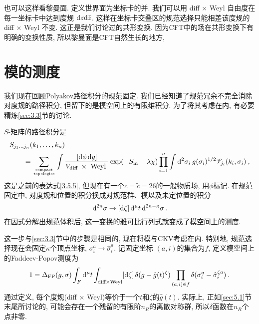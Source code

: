 也可以这样看黎曼面. 定义世界面为坐标卡的并. 我们可以用 diff $\times$ Weyl 自由度在每一坐标卡中达到度规 $\mathrm{d} z \mathrm{d} \bar{z}$. 
这样在坐标卡交叠区的规范选择只能相差该度规的diff $\times$ Weyl 不变. 这正是我们讨论过的共形变换. 
因为CFT中的场在共形变换下有明确的变换性质, 所以黎曼面是CFT自然生长的地方, 

\section{\texorpdfstring{模的测度}{5.3 The measure for moduli}} \label{sec:5.3}

我们现在回顾Polyakov路径积分的规范固定. 我们已经知道了规范冗余不完全消除对度规的路径积分, 但留下的是模空间上的有限维积分. 
为了将其考虑在内, 有必要精炼\ref{sec:3.3}节的讨论.

$S$-矩阵的路径积分是
	\begin{align}
		&S_{j_{1} \ldots j_{n}}(k_{1}, \ldots, k_{n})  \nonumber \\
		&\qquad=\sum_{\text{compact} \atop
				\text {topologies}} \int \frac{[\mathrm{d} \phi \,\mathrm{d} g]}{V_{\text {diff }} \times \text { Weyl }} 
				\exp (-S_{\mathrm{m}}-\lambda \chi) \prod_{i=1}^{n} \int \mathrm{d}^{2} \sigma_{i} \: g(\sigma_{i})^{1 / 2} 
				\mathscr{V}_{j_{i}}(k_{i}, \sigma_{i}) \:, \label{5.3.1}
	\end{align}
这是之前的表达式\eqref{3.5.5}, 但现在有一个$c=\tilde{c}=26$的一般物质场, 用$\phi$标记. 在规范固定中, 对度规和位置的积分换成对规范群、模以及未定位置的积分
\begin{equation}
	[\dif g]\, \dif^{2 n} \sigma \rightarrow [\dif \zeta] \,\dif^{\mu} t \,\dif^{2 n-\kappa} \sigma \:. \label{5.3.2}
\end{equation}
在因式分解出规范体积后, 这一变换的雅可比行列式就变成了模空间上的测度.

这一步与\ref{sec:3.3}节中的步骤是相同的, 现在将模与CKV考虑在内. 特别地, 规范选择现在会固定$\kappa$个顶点坐标, $\sigma_{i}^{a} \rightarrow \hat{\sigma}_{i}^{a}$. 
记固定坐标 $(a, i)$的集合为$f$, 定义模空间上的Faddeev-Popov测度为
\begin{equation}
	1=\Delta_{\mathrm{FP}}(g, \sigma) \int_{F} \mathrm{d}^{\mu} t \int_{\text{diff} \times \text{Weyl}}[\mathrm{d} \zeta] \,
	\delta(g-\hat{g}(t)^{\zeta}) \prod_{(a, i) \in f} \delta(\sigma_{i}^{a}-\hat{\sigma}_{i}^{\zeta a}) \:. \label{5.3.3}
\end{equation}
通过定义, 每个度规(diff $\times$ Weyl)等价于一个$t$和$\zeta $的$\hat{g}(t)$. 实际上, 正如\ref{sec:5.1}节末尾所讨论的, 可能会存在一个残留的有限阶$n_{R}$的离散对称群, 所以$\delta$函数在$n_{R}$个点非零.

